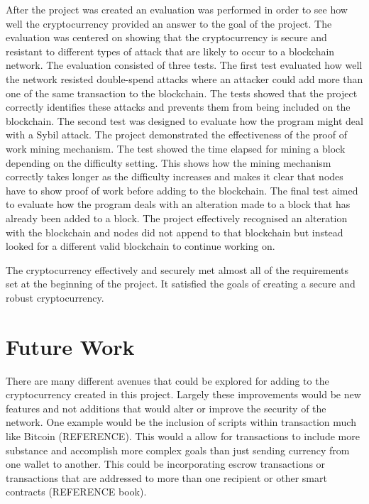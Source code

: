 \documentclass{l4proj}
\begin{document}
After the project was created an evaluation was performed in order to see how well the cryptocurrency provided an answer
to the goal of the project. The evaluation was centered on showing that the cryptocurrency is secure and resistant to 
different types of attack that are likely to occur to a blockchain network. The evaluation consisted of three tests.
The first test evaluated how well the network resisted double-spend attacks where an attacker could add more than one
of the same transaction to the blockchain. The tests showed that the project correctly identifies these attacks and
prevents them from being included on the blockchain. The second test was designed to evaluate how the program might
deal with a Sybil attack. The project demonstrated the effectiveness of the proof of work mining mechanism. The test 
showed the time elapsed for mining a block depending on the difficulty setting. This shows how the mining mechanism 
correctly takes longer as the difficulty increases and makes it clear that nodes have to show proof of work before
adding to the blockchain. The final test aimed to evaluate how the program deals with an alteration made to a block
that has already been added to a block. The project effectively recognised an alteration with the blockchain and 
nodes did not append to that blockchain but instead looked for a different valid blockchain to continue working on.

The cryptocurrency effectively and securely met almost all of the requirements set at the beginning of the project. It
satisfied the goals of creating a secure and robust cryptocurrency.


\section{Future Work}
There are many different avenues that could be explored for adding to the cryptocurrency created in this project. 
Largely these improvements would be new features and not additions that would alter or improve the security of the
network. One example would be the inclusion of scripts within transaction much like Bitcoin (REFERENCE). This would a
allow for transactions to include more substance and accomplish more complex goals than just sending currency from 
one wallet to another. This could be incorporating escrow transactions or transactions that are addressed to more than
one recipient or other smart contracts (REFERENCE book).
\end{document}
